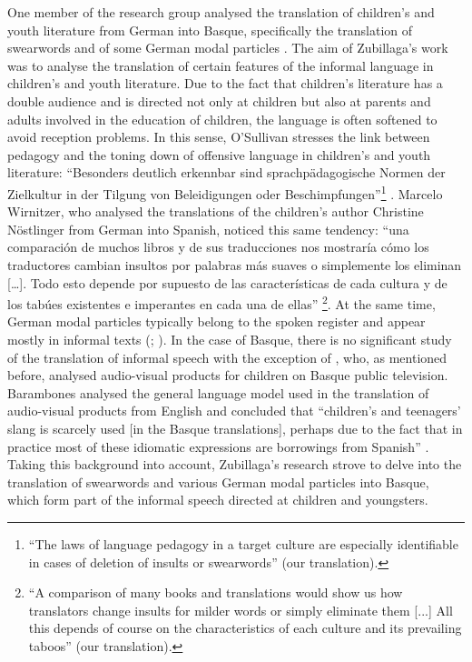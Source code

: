 \documentclass[output=paper]{LSP/langsci}
\begin{document}
One member of the research group analysed the translation of children’s and youth literature from German into Basque, specifically the translation of swearwords and of some German modal particles \citep{Zubillaga2013}. The aim of Zubillaga’s work was to analyse the translation of certain features of the informal language in children’s and youth literature. Due to the fact that children’s literature has a double audience and is directed not only at children but also at parents and adults involved in the education of children, the language is often softened to avoid reception problems. In this sense, O’Sullivan stresses the link between pedagogy and the toning down of offensive language in children’s and youth literature: “Besonders deutlich erkennbar sind sprachpädagogische Normen der Zielkultur in der Tilgung von Beleidigungen oder Beschimpfungen”\footnote{“The laws of language pedagogy in a target culture are especially identifiable in cases of deletion of insults or swearwords” (our translation).}  \citep[212]{OSullivan2000}. Marcelo Wirnitzer, who analysed the translations of the children’s author Christine Nöstlinger from German into Spanish, noticed this same tendency: “una comparación de muchos libros y de sus traducciones nos mostraría cómo los traductores cambian insultos por palabras más suaves o simplemente los eliminan […]. Todo esto depende por supuesto de las características de cada cultura y de los tabúes existentes e imperantes en cada una de ellas” \citep[146]{Marcelo2007}\footnote{“A comparison of many books and translations would show us how translators change insults for milder words or simply eliminate them [...] All this depends of course on the characteristics of each culture and its prevailing taboos” (our translation).}. At the same time, German modal particles typically belong to the spoken register and appear mostly in informal texts (\citealt[12]{Helbig1988}; \citealt[16]{Pruefer1995}). In the case of Basque, there is no significant study of the translation of informal speech with the exception of \citet{Barambones2012}, who, as mentioned before, analysed audio-visual products for children on Basque public television. Barambones analysed the general language model used in the translation of audio-visual products from English and concluded that “children’s and teenagers’ slang is scarcely used [in the Basque translations], perhaps due to the fact that in practice most of these idiomatic expressions are borrowings from Spanish” \citep[166--167]{Barambones2012}. Taking this background into account, Zubillaga's research strove to delve into the translation of swearwords and various German modal particles into Basque, which form part of the informal speech directed at children and youngsters.
\end{document}
